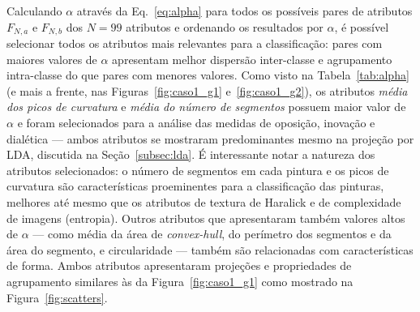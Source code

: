 Calculando $\alpha$ através da Eq.~\ref{eq:alpha} para todos os
possíveis pares de atributos $F_{N, a}$ e $F_{N, b}$ dos $N = 99$
atributos e ordenando os resultados por $\alpha$, é possível
selecionar todos os atributos mais relevantes para a classificação:
pares com maiores valores de $\alpha$ apresentam melhor dispersão
inter-classe e agrupamento intra-classe do que pares com menores
valores. Como visto na Tabela~\ref{tab:alpha} (e mais a frente, nas
Figuras~\ref{fig:caso1_g1} e~\ref{fig:caso1_g2}), os atributos
\emph{média dos picos de curvatura} e \emph{média do número de
  segmentos} possuem maior valor de $\alpha$ e foram selecionados para
a análise das medidas de oposição, inovação e dialética --- ambos
atributos se mostraram predominantes mesmo na projeção por LDA,
discutida na Seção~\ref{subsec:lda}. É interessante notar a natureza
dos atributos selecionados: o número de segmentos em cada pintura e os
picos de curvatura são características proeminentes para a
classificação das pinturas, melhores até mesmo que os atributos de
textura de Haralick e de complexidade de imagens (entropia). Outros
atributos que apresentaram também valores altos de $\alpha$ --- como
média da área de \textit{convex-hull}, do perímetro dos segmentos e da
área do segmento, e circularidade --- também são relacionadas com
características de forma. Ambos atributos apresentaram projeções e
propriedades de agrupamento similares às da Figura~\ref{fig:caso1_g1}
como mostrado na Figura~\ref{fig:scatters}.
 
